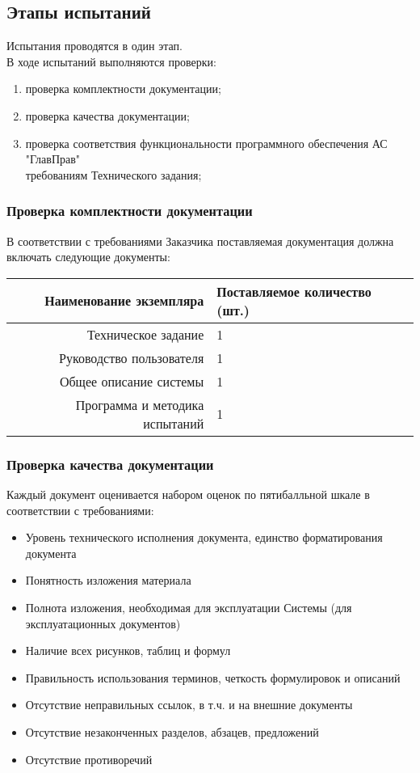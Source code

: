 \documentclass[russian, utf8, 12pt,pointsubsection,floatsubsection]{eskdtext}
\begin{document}
\subsection{Этапы испытаний}
Испытания проводятся в один этап.\\
В ходе испытаний выполняются проверки: 
\begin{enumerate}
    \item проверка комплектности документации;
    \item проверка качества документации;
    \item проверка соответствия функциональности программного обеспечения АС "ГлавПрав"\\
    требованиям Технического задания;
\end{enumerate}


    
\subsubsection{Проверка комплектности документации}
В соответствии с требованиями Заказчика поставляемая документация должна включать следующие документы:

\begin{tabular}{|r|l|}
\hline \hline
Наименование экземпляра & Поставляемое количество (шт.) \\
\hline \hline
Техническое задание & 1 \\
\hline
Руководство пользователя & 1 \\
\hline
Общее описание системы & 1 \\
\hline 
Программа и методика испытаний & 1 \\
\hline
\end{tabular}

\subsubsection{Проверка качества документации}
Каждый документ оценивается набором оценок по пятибалльной шкале в соответствии с требованиями:
\begin{itemize}
    \item Уровень технического исполнения документа, единство форматирования документа 
    \item Понятность изложения материала
    \item Полнота изложения, необходимая для эксплуатации Системы (для эксплуатационных документов)
    \item Наличие всех рисунков, таблиц и формул
    \item Правильность использования терминов, четкость формулировок и описаний
    \item Отсутствие неправильных ссылок, в т.ч. и на внешние документы
    \item Отсутствие незаконченных разделов, абзацев, предложений
    \item Отсутствие противоречий
\end{itemize}
 
\end{document}
